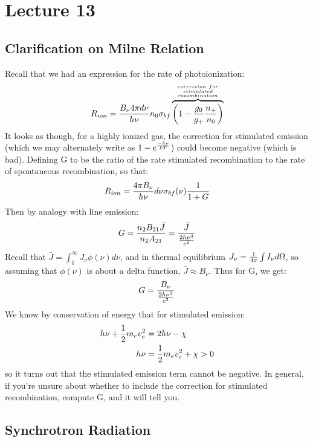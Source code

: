 \documentclass[11pt]{article}
\def\_{\bar}
\def\hf{{1 \over 2}}
\def\inv#1{{1 \over #1}}
\def\ato{{A_{21}}}
\def\bto{{B_{21}}}
\begin{document}
\section*{ Lecture 13 }

\subsection*{ Clarification on Milne Relation}

Recall that we had an expression for the rate of photoionization:
$$R_{ion}={B_\nu4\pi d\nu\over h\nu}n_0\sigbf
\overbrace{\left(1-{g_0\over g_+}{n_+\over n_0}\right)}^{{correction\ for\atop 
stimulated}\atop recombination}$$
It looks as though, for a highly ionized gas, the correction for stimulated 
emission (which we may alternately write as $1-e^{-h\nu\over kT}$) could 
become negative (which is bad).
Defining G to be the ratio of the rate stimulated 
recombination to the rate of spontaneous recombination, so that:
$$R_{ion}={4\pi B_\nu\over h\nu}d\nu\sigbf(\nu)\inv{1+G}$$
Then by analogy with line emission:
$$G={n_2\bto\_J\over n_2\ato}={\_J\over {2h\nu^3\over c^2}}$$
Recall that $\_J=\int_0^\infty{J_\nu\phi(\nu)d\nu}$, and in thermal
equilibrium $J_\nu=\inv{4\pi}\int{I_\nu d\Omega}$, so assuming that
$\phi(\nu)$ is about a delta function, 
$\_J\approx B_\nu$.  Thus for G, we get:
$$G={B_\nu\over{2h\nu^3\over c^2}}$$
We know by conservation of energy that for
stimulated emission:
$$\begin{aligned}h\nu+\hf m_ev_e^2&=2h\nu-\chi\\ 
h\nu&=\hf m_ev_e^2+\chi>0\\ \end{aligned}$$
so it turns out that the stimulated emission term cannot be negative.  In 
general,
if you're unsure about whether to include the correction for stimulated
recombination, compute G, and it will tell you.

\subsection*{ Synchrotron Radiation}
\end{document}
